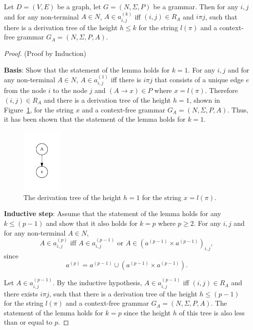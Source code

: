 \begin{lemma}\label{lemma:cf}
Let $D = (V,E)$ be a graph, let $G =(N,\Sigma,P)$ be a grammar. Then for any $i, j$ and for any non-terminal $A \in N$, $A \in a^{(k)}_{i,j}$ iff $(i,j) \in R_A$ and $i \pi j$, such that there is a derivation tree of the height $h \leq k$ for the string $l(\pi)$ and a context-free grammar $G_A = (N,\Sigma,P,A)$.
\end{lemma}
\begin{proof}(Proof by Induction)

\textbf{Basis}: Show that the statement of the lemma holds for $k = 1$. For any $i, j$ and for any non-terminal $A \in N$, $A \in a^{(1)}_{i,j}$ iff there is $i \pi j$ that consists of a unique edge $e$ from the node $i$ to the node $j$ and $(A \rightarrow x) \in P$ where $x = l(\pi)$. Therefore $(i,j) \in R_A$ and there is a derivation tree of the height $h = 1$, shown in Figure~\ref{tree1}, for the string $x$ and a context-free grammar $G_A = (N,\Sigma,P,A)$. Thus, it has been shown that the statement of the lemma holds for $k = 1$.

\begin{figure}[h!]
 \centering
 \includegraphics[width=2cm]{pictures/tree1.pdf}
 \caption{The derivation tree of the height $h = 1$ for the string $x = l(\pi)$.}
 \label{tree1}
\end{figure}

\textbf{Inductive step}: Assume that the statement of the lemma holds for any $k \leq (p - 1)$ and show that it also holds for $k = p$ where $p \geq 2$. For any $i, j$ and for any non-terminal $A \in N$, $$A \in a^{(p)}_{i,j} \text{ iff } A \in a^{(p-1)}_{i,j} \text{ or } A \in (a^{(p-1)} \times a^{(p-1)})_{i,j},$$ since $$a^{(p)} = a^{(p-1)} \cup (a^{(p-1)} \times a^{(p-1)}).$$

Let $A \in a^{(p-1)}_{i,j}$. By the inductive hypothesis, $A \in a^{(p-1)}_{i,j}$ iff $(i,j) \in R_A$ and there exists $i \pi j$, such that there is a derivation tree of the height $h \leq (p-1)$ for the string $l(\pi)$ and a context-free grammar $G_A = (N,\Sigma,P,A)$. The statement of the lemma holds for $k = p$ since the height $h$ of this tree is also less than or equal to $p$.


\end{proof}

